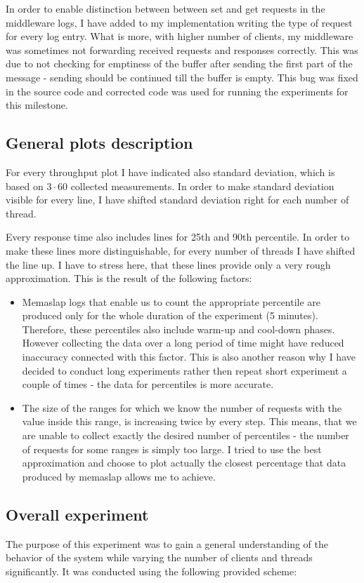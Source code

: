 \documentclass[11pt]{article}
\begin{document}
In order to enable distinction between between set and get requests in the middleware logs, I have added to my implementation writing the type of request for every log entry. What is more, with higher number of clients, my middleware was sometimes not forwarding received requests and responses correctly. This was due to not checking for emptiness of the buffer after sending the first part of the message - sending should be continued till the buffer is empty. This bug was fixed in the source code and corrected code was used for running the experiments for this milestone.

\subsection{General plots description}
For every throughput plot I have indicated also standard deviation, which is based on $3\cdot60$ collected measurements. In order to make standard deviation visible for every line, I have shifted standard deviation right for each number of thread.

Every response time also includes lines for 25th and 90th percentile. In order to make these lines more distinguishable, for every number of threads I have shifted the line up. I have to stress here, that these lines provide only a very rough approximation. This is the result of the following factors:
\begin{itemize}
\item Memaslap logs that enable us to count the appropriate percentile are produced only for the whole duration of the experiment (5 minutes). Therefore, these percentiles also include warm-up and cool-down phases. However collecting the data over a long period of time might have reduced inaccuracy connected with this factor. This is also another reason why I have decided to conduct long experiments rather then repeat short experiment a couple of times - the data for percentiles is more accurate.
\item The size of the ranges for which we know the number of requests with the value inside this range, is increasing twice by every step. This means, that we are unable to collect exactly the desired number of percentiles - the number of requests for some ranges is simply too large. I tried to use the best approximation and choose to plot actually the closest percentage that data produced by memaslap allows me to achieve.
\end{itemize}

\subsection{Overall experiment}
The purpose of this experiment was to gain a general understanding of the behavior of the system while varying the number of clients and threads significantly. It was conducted using the following provided scheme:
\medskip
\end{document}
